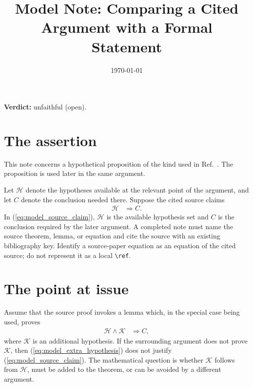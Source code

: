 \documentclass{article}
\title{Model Note: Comparing a Cited Argument with a Formal Statement}
\author{}
\date{\today}
\providecommand{\gapnote}[2]{%
    \par\noindent\textbf{Verdict:} #1 (#2).\par}
\begin{document}
\maketitle
\gapnote{unfaithful}{open}


\section{The assertion}

This note concerns a hypothetical proposition of the kind used in
Ref.~\cite{Cirac2021Matrix}. The proposition is used later in the same
argument.

Let $\mathcal H$ denote the hypotheses available at the relevant point of the
argument, and let $C$ denote the conclusion needed there. Suppose the cited
source claims
\begin{align}
    \mathcal H &\Longrightarrow C.
    \label{eq:model_source_claim}
\end{align}
In (\ref{eq:model_source_claim}), $\mathcal H$ is the available hypothesis set
and $C$ is the conclusion required by the later argument. A completed note must
name the source theorem, lemma, or equation and cite the source with an existing
bibliography key. Identify a source-paper equation as an equation of the cited
source; do not represent it as a local \verb|\ref|.

\section{The point at issue}

Assume that the source proof invokes a lemma which, in the special case being
used, proves
\begin{align}
    \mathcal H\wedge\mathcal K &\Longrightarrow C,
    \label{eq:model_extra_hypothesis}
\end{align}
where $\mathcal K$ is an additional hypothesis. If the surrounding argument
does not prove $\mathcal K$, then
(\ref{eq:model_extra_hypothesis}) does not justify
(\ref{eq:model_source_claim}). The mathematical question is whether
$\mathcal K$ follows from $\mathcal H$, must be added to the theorem, or can be
avoided by a different argument.
\end{document}
